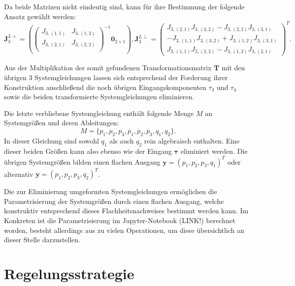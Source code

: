 Da beide Matrizen nicht eindeutig sind, kann für ihre Bestimmung der folgende Ansatz gewählt werden: 
\begin{equation}
	\mathbf{J}_3^{L+} =
	\left(
	\left(\begin{matrix}
		J_{3, (1,1)} & J_{3, (1,2)}\\
		J_{3, (2,1)} & J_{3, (2,2)}\\
	\end{matrix}\right)^{-1}	
	\mathbf{0}_{2 \times 1}
	\right), 		
	\mathbf{J}_3^{L\perp} =
	\left(\begin{matrix}
		J_{3, (2,1)} J_{3, (3,2)} - J_{3, (2,2)} J_{3, (3,1)} \\
		-J_{3, (1,1)} J_{3, (3,2)} + J_{3, (1,2)} J_{3, (3,1)} \\
		J_{3, (1,1)} J_{3, (2,2)} - J_{3, (1,2)} J_{3, (2,1)}
	\end{matrix}\right)^T.
\end{equation}

Aus der Multiplikation der somit gefundenen Transformationsmatrix $\mathbf{T}$ mit den übrigen 3 Systemgleichungen lassen sich entsprechend der Forderung ihrer Konstruktion anschließend die noch übrigen Eingangskomponenten $\tau_{3}$ und $\tau_{4}$ sowie die beiden transformierte Systemgleichungen eliminieren.

Die letzte verbliebene Systemgleichung enthält folgende Menge $M$ an Systemgrößen und deren Ableitungen:
\begin{equation}
	M = \{p_1, p_2, p_3, \ddot{p_1}, \ddot{p_2}, \ddot{p_3}, q_1, q_2 \}.
\end{equation}
In dieser Gleichung sind sowohl $q_1$ als auch $q_2$ rein algebraisch enthalten. Eine dieser beiden Größen kann also ebenso wie der Eingang $\mathbf{\tau}$ eliminiert werden. Die übrigen Systemgrößen bilden einen flachen Ausgang $\mathbf{y} = (p_1, p_2, p_3, q_1)^T$ oder alternativ $\mathbf{y} = (p_1, p_2, p_3, q_2)^T$. 

Die zur Eliminierung umgeformten Systemgleichungen ermöglichen die Parametrisierung der Systemgrößen durch einen flachen Ausgang, welche konstruktiv entsprechend dieses Flachheitsnachweises bestimmt werden kann. Im Konkreten ist die Parametrisierung im Jupyter-Notebook (LINK!) berechnet worden, besteht allerdings aus zu vielen Operationen, um diese übersichtlich an dieser Stelle darzustellen.

\chapter{Regelungsstrategie}

